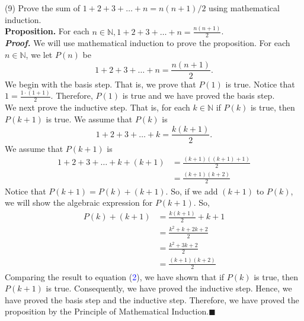 \documentclass{article}
\begin{document}
(9) Prove the sum of $1 + 2 + 3 +\ldots+ n = n(n + 1) / 2$ using mathematical induction.\\

\textbf{Proposition.} For each $n \in \mathbb{N}, 1 + 2 + 3 +\ldots+ n = \frac{n(n + 1)}{2}$.\\
\textit{\textbf{Proof.}} We will use mathematical induction to prove the proposition. For each $n \in \mathbb{N}$, we let $P(n)$ be
\begin{equation*}
1 + 2 + 3 +\ldots+ n = \frac{n(n + 1)}{2}.
\end{equation*}
We begin with the basis step. That is, we prove that $P(1)$ is true. Notice that $1 = \frac{1 \cdot (1 + 1)}{2}$. Therefore, $P(1)$ is true and we have proved the basis step.\\
We next prove the inductive step. That is, for each $k \in \mathbb{N}$ if $P(k)$ is true, then $P(k + 1)$ is true. We assume that $P(k)$ is
\begin{equation}
1 + 2 + 3 +\ldots+ k = \frac{k(k + 1)}{2}.
\end{equation}
We assume that $P(k + 1)$ is
\begin{align}
1 + 2 + 3 +\ldots+ k + (k + 1) &= \frac{(k + 1)((k + 1) + 1)}{2}\nonumber \\
&= \frac{(k + 1)(k + 2)}{2}
\end{align}
Notice that $P(k + 1) = P(k) + (k + 1)$. So, if we add $(k + 1)$ to $P(k)$, we will show the algebraic expression for $P(k + 1)$. So,
\begin{align*}
P(k) + (k + 1) &= \frac{k(k + 1)}{2} + k + 1\\
&= \frac{k^2 + k + 2k + 2}{2}\\
&= \frac{k^2 + 3k + 2}{2}\\
&= \frac{(k + 1)(k + 2)}{2}
\end{align*}
Comparing the result to equation (\textcolor{blue}{2}), we have shown that if $P(k)$ is true, then $P(k + 1)$ is true. Consequently, we have proved the inductive step. Hence, we have proved the basis step and the inductive step. Therefore, we have proved the proposition by the Principle of Mathematical Induction.\hfill$\blacksquare$
\end{document}
